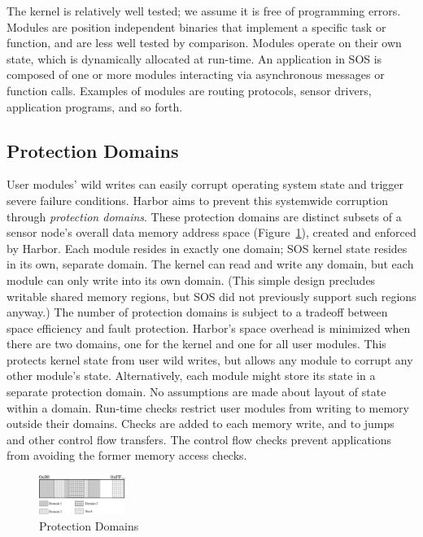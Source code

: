 % 
% 
% 
% 
% 
The kernel is relatively well tested; we assume it is free of
programming errors.
% 
Modules are position independent binaries that implement a specific
task or function, and are less well tested by comparison.
% 
Modules operate on their own state, which is dynamically allocated at
run-time.
% 
An application in SOS is composed of one or more modules interacting
via asynchronous messages or function calls.
% 
Examples of modules are routing protocols, sensor drivers, application
programs, and so forth.
\subsection{Protection Domains}
% 
User modules' wild writes can easily corrupt operating system state
and trigger severe failure conditions.
% 
Harbor aims to prevent this systemwide corruption through \emph{protection domains}.
% 
% 
% 
These protection domains are
% 
distinct subsets of a sensor node's overall data memory address space
(Figure~\ref{fig:prot_domains}), created and enforced by Harbor.
% 
Each module resides in exactly one domain; SOS kernel state resides in
its own, separate domain.
% 
The kernel can read and write any domain, but each module can only write
into its own domain.
% 
(This simple design precludes writable shared memory regions, but SOS did
not previously support such regions anyway.)
% 
The number of protection domains is subject to a tradeoff between space
efficiency and fault protection.
%
Harbor's space overhead is minimized when there are two domains, one
for the kernel and one for all user modules.
%
This protects kernel state from user wild writes, but allows any
module to corrupt any other module's state.
%
Alternatively, each module might store its state in a separate
protection domain.
% 
No assumptions are made about layout of state within a domain.
% 
Run-time checks restrict user modules from writing to memory outside
their domains.
% 
Checks are added to each memory write, and to jumps and other control
flow transfers.  
%
The control flow checks prevent applications from avoiding the former memory access
checks.
\begin{figure}[htbp]
  \centering
  \includegraphics[height = 0.5in,
  keepaspectratio=true]{figures/domains.eps} 
  \caption{Protection Domains}
  \label{fig:prot_domains}
\end{figure}


